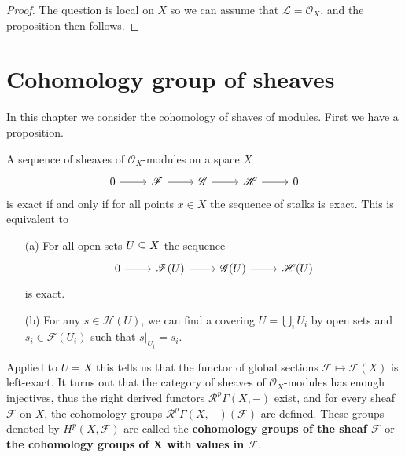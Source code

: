 \begin{proof}
The question is local on $X$ so we can assume that $\mathscr{L}=\mathscr{O}_X$, and the proposition then follows.
\end{proof}

\chapter{Cohomology group of sheaves}
In this chapter we consider the cohomology of shaves of modules. First we have a proposition.
\begin{proposition}
A sequence of sheaves of $\mathscr{O}_X$-modules on a space $X$
\[\begin{tikzcd}
0\ar[r]&\mathscr{F}\ar[r]&\mathscr{G}\ar[r]&\mathscr{H}\ar[r]&0
\end{tikzcd}\]
is exact if and only if for all points $x\in X$ the sequence of stalks is exact. This is equivalent to
\begin{itemize}
\item[(a)] For all open sets $U\subseteq X$ the sequence
\[\begin{tikzcd}
0\ar[r]&\mathscr{F}(U)\ar[r]&\mathscr{G}(U)\ar[r]&\mathscr{H}(U)
\end{tikzcd}\]
is exact.
\item[(b)] For any $s\in\mathscr{H}(U)$, we can find a covering $U=\bigcup_iU_i$ by open sets and $s_i\in\mathscr{F}(U_i)$ such that $s|_{U_i}=s_i$.
\end{itemize}
\end{proposition}
Applied to $U=X$ this tells us that the functor of global sections $\mathscr{F}\mapsto\mathscr{F}(X)$ is left-exact. It turns out that the category of sheaves of $\mathscr{O}_X$-modules has enough injectives, thus the right derived functors $\mathcal{R}^p\Gamma(X,-)$ exist, and for every sheaf $\mathscr{F}$ on $X$, the cohomology groups $\mathcal{R}^p\Gamma(X,-)(\mathscr{F})$ are defined. These groups denoted by $H^p(X,\mathscr{F})$ are called the \textbf{cohomology groups of the sheaf $\mathscr{F}$} or \textbf{the cohomology groups of $\bm{X}$ with values in $\mathscr{F}$}.
